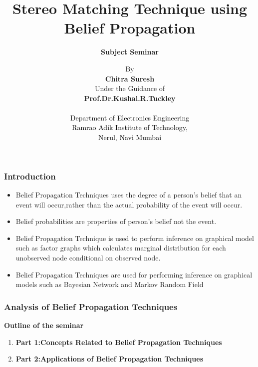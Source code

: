 \documentclass{beamer}
\title{\textbf{ Stereo Matching Technique using Belief Propagation}}
\subtitle{\textbf{Subject Seminar}}
\begin{document}
\author[Chitra Suresh] {By \\ \vspace{0.05in} \textbf{Chitra Suresh } \\ \vspace{0.01in} {Under the Guidance of} \\ \textbf{Prof.Dr.Kushal.R.Tuckley  }\\
\textcolor{black}{ \\ Department of Electronics Engineering} \\ \textcolor{black}{Ramrao Adik Institute of Technology,\\ Nerul, Navi Mumbai } \\}



\begin{frame}
\frametitle{Introduction}
\begin{itemize}
\item Belief Propagation Techniques uses the degree of a person's belief that an event will occur,rather than the actual probability  of the event will occur.
\item Belief probabilities are  properties of person's belief not the event.
\item Belief Propagation Technique is used to perform inference on graphical  model  such as factor graphs which calculates marginal distribution for each unobserved node
conditional on observed node.
\item Belief Propagation Techniques  are used for performing inference on graphical models such as Bayesian Network and Markov Random Field
\end{itemize}
\end{frame}


\begin{frame}
\frametitle{Analysis of Belief Propagation Techniques}
\textbf{Outline of the seminar}
\begin{enumerate}
\item \textbf{Part 1:{Concepts Related to Belief Propagation Techniques}}
\item \textbf{Part 2:{Applications of Belief Propagation Techniques}}
\end{enumerate}
\end{frame}
\end{document}
